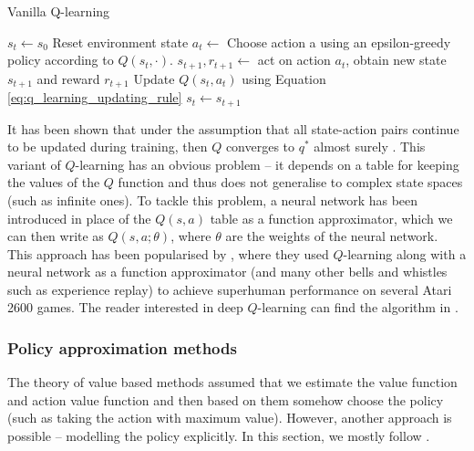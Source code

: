 \begin{algorithm}
\small
\caption{Vanilla Q-learning \cite[p. 131]{sutton2018reinforcement}}\label{alg:q_learning}
\begin{algorithmic}
\Require{Choose the learning rate $\alpha \in (0,1]$ and exploration parameter $\epsilon>0$, number of episodes, initialise $Q(s, a), s \in \{s \, \mathrm{for} \,  s \, \mathrm{in} \, \mathcal{S} \, \mathrm{if} \, s \, \mathrm{is \, not \, final}\}$ and $Q(s,a)=0$ for $s$ final, $a \in \mathcal{A}$ (final state means that the environment is finished).}
\State $s_t \leftarrow s_0$ Reset environment state 
\State $a_t \leftarrow$ Choose action a using an epsilon-greedy policy according to $Q(s_t,\cdot).$
\State $s_{t+1}, r_{t+1} \leftarrow$ act on action $a_t$, obtain new state $s_{t+1}$ and reward $r_{t+1} $
\State Update $Q(s_t,a_t)$ using Equation \ref{eq:q_learning_updating_rule}
\State $s_t \leftarrow s_{t+1}$
\EndWhile
\EndFor
\end{algorithmic}
\end{algorithm}
It has been shown that under the assumption that all state-action pairs continue to be updated during training, then $Q$ converges to $q^*$ almost surely \cite[p. 131]{sutton2018reinforcement}. This variant of $Q$-learning has an obvious problem -- it depends on a table for keeping the values of the $Q$ function and thus does not generalise to complex state spaces (such as infinite ones). To tackle this problem, a neural network has been introduced in place of the $Q(s,a)$ table as a function approximator, which we can then write as $Q(s,a;\theta)$, where $\theta$ are the weights of the neural network. This approach has been popularised by \cite{deep_q_learning_paper}, where they used $Q$-learning along with a neural network as a function approximator (and many other bells and whistles such as experience replay) to achieve superhuman performance on several Atari 2600 games. The reader interested in deep $Q$-learning can find the algorithm in \cite[Algorithm 1]{deep_q_learning_paper}.

\subsubsection{Policy approximation methods}
The theory of value based methods assumed that we estimate the value function and action value function and then based on them somehow choose the policy (such as taking the action with maximum value). However, another approach is possible -- modelling the policy explicitly. In this section, we mostly follow  \cite[Chapter 13]{sutton2018reinforcement}.

